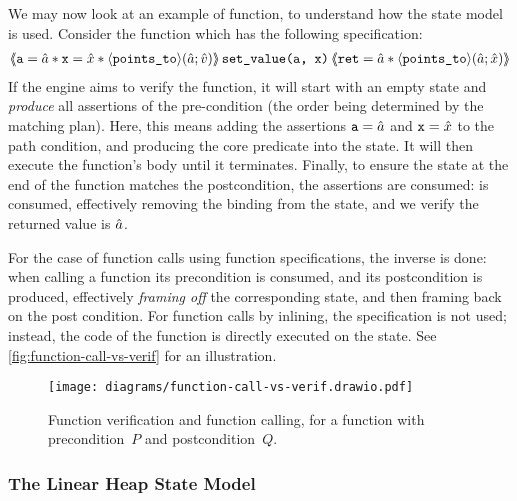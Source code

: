 We may now look at an example of function, to understand how the state model is used. Consider the function  which has the following specification:
\begin{align*}%
\ESLtriple
	{\code{a}=\sym a * \code{x} = \sym x * \corepred{\pointsto}{\sym a}{\sym v}}
	{set\_value(a, x)}
	{\code{ret}=\sym a * \corepred{\pointsto}{\sym a}{\sym x}}
\end{align*}%
If the engine aims to verify the function, it will start with an empty state and \emph{produce} all assertions of the pre-condition (the order being determined by the matching plan). Here, this means adding the assertions $\texttt{a} = \hat{a}$ and $\texttt{x} = \hat{x}$ to the path condition, and producing the core predicate  into the state. It will then execute the function's body until it terminates. Finally, to ensure the state at the end of the function matches the postcondition, the assertions are consumed:  is consumed, effectively removing the binding from the state, and we verify the returned value is $\hat{a}$.

For the case of function calls using function specifications, the inverse is done: when calling a function its precondition is consumed, and its postcondition is produced, effectively \emph{framing off} the corresponding state, and then framing back on the post condition. For function calls by inlining, the specification is not used; instead, the code of the function is directly executed on the state. See \autoref{fig:function-call-vs-verif} for an illustration.

\begin{figure}
	\centering
	\texttt{[image: diagrams/function-call-vs-verif.drawio.pdf]}
	\caption{Function verification and function calling, for a function with precondition~$P$ and postcondition~$Q$.}
	\label{fig:function-call-vs-verif}
\end{figure}

\subsubsection{The Linear Heap State Model}

